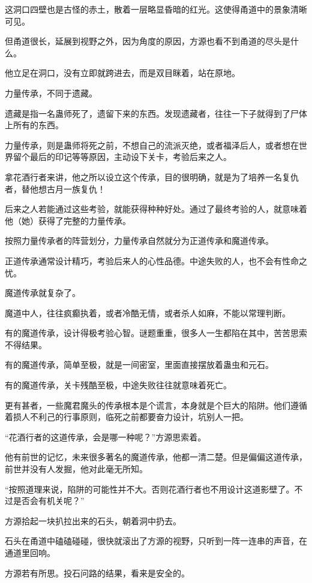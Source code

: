 \begin{this_body}
这洞口四壁也是古怪的赤土，散着一层略显昏暗的红光。这使得甬道中的景象清晰可见。

但甬道很长，延展到视野之外，因为角度的原因，方源也看不到甬道的尽头是什么。

他立足在洞口，没有立即就跨进去，而是双目眯着，站在原地。

力量传承，不同于遗藏。

遗藏是指一名蛊师死了，遗留下来的东西。发现遗藏者，往往一下子就得到了尸体上所有的东西。

力量传承，则是蛊师将死之前，不想自己的流派灭绝，或者福泽后人，或者想在世界留个最后的印记等等原因，主动设下关卡，考验后来之人。

拿花酒行者来讲，他之所以设立这个传承，目的很明确，就是为了培养一名复仇者，替他想古月一族复仇！

后来之人若能通过这些考验，就能获得种种好处。通过了最终考验的人，就意味着他（她）获得了完整的力量传承。

按照力量传承者的阵营划分，力量传承自然就分为正道传承和魔道传承。

正道传承通常设计精巧，考验后来人的心性品德。中途失败的人，也不会有性命之忧。

魔道传承就复杂了。

魔道中人，往往疯癫执着，或者冷酷无情，或者杀人如麻，不能以常理判断。

有的魔道传承，设计得极考验心智。谜题重重，很多人一生都陷在其中，苦苦思索不得结果。

有的魔道传承，简单至极，就是一间密室，里面直接摆放着蛊虫和元石。

有的魔道传承，关卡残酷至极，中途失败往往就意味着死亡。

更有甚者，一些魔君魔头的传承根本是个谎言，本身就是个巨大的陷阱。他们遵循着损人不利己的行事原则，临死之前都要奋力设计，坑别人一把。

“花酒行者的这道传承，会是哪一种呢？”方源思索着。

他有前世的记忆，未来很多著名的魔道传承，他都一清二楚。但是偏偏这道传承，前世并没有人发掘，他对此毫无所知。

“按照道理来说，陷阱的可能性并不大。否则花酒行者也不用设计这道影壁了。不过是否会有机关呢？”

方源拾起一块扒拉出来的石头，朝着洞中扔去。

石头在甬道中磕磕碰碰，很快就滚出了方源的视野，只听到一阵一连串的声音，在通道里回响。

方源若有所思。投石问路的结果，看来是安全的。


\end{this_body}
